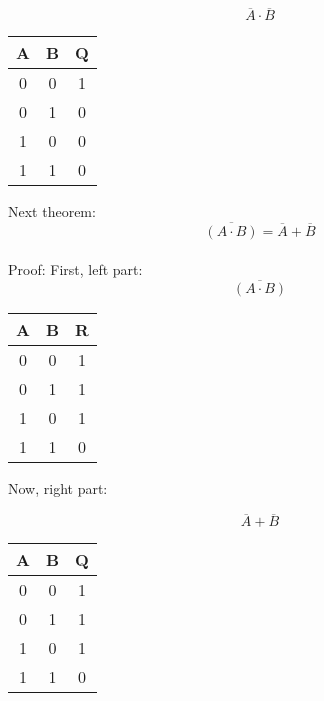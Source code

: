 \documentclass[a4paper]{article}
\begin{document}
\begin{equation}
	\overline{A} \cdot \overline{B}
	\end{equation}
\begin{center}
            \begin{tabular}{|c|c||c|}
                \hline
                A&B&Q \\
                \hline
                0&0&1 \\
                \hline
                0&1&0 \\
                \hline
                1&0&0 \\
                \hline
                1&1&0 \\
                \hline
            \end{tabular}
\end{center}    
        
Next theorem:
\begin{equation}
	\overline{(A\cdot B)} = \overline{A} + \overline{B}
	\end{equation}\\
Proof: 
 First, left part:
\begin{equation}
\overline{(A\cdot B)}
\end{equation}
\begin{center}
            \begin{tabular}{|c|c||c|}
                \hline
                A&B&R \\
                \hline
                0&0&1 \\
                \hline
                0&1&1 \\
                \hline
                1&0&1 \\
                \hline
                1&1&0 \\
                \hline
            \end{tabular}
        \end{center}
Now, right part:

\begin{equation}
	\overline{A} + \overline{B}
	\end{equation}
\begin{center}
            \begin{tabular}{|c|c||c|}
                \hline
                A&B&Q \\
                \hline
                0&0&1 \\
                \hline
                0&1&1 \\
                \hline
                1&0&1 \\
                \hline
                1&1&0 \\
                \hline
            \end{tabular}
\end{center}    
      
\end{document}
